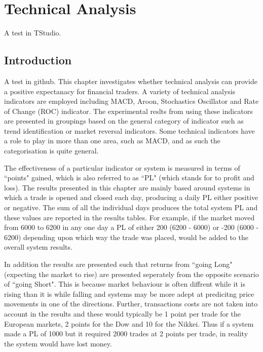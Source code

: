 
\chapter{Technical Analysis} %
 
\label{Chapter4} %


A test in TStudio.
\section{Introduction}
A test in github.
This chapter investigates whether technical analysis can provide a positive expectanacy for financial traders. A variety of technical analysis indicators are employed including MACD, Aroon, Stochastics Oscillator and Rate of Change (ROC) indicator. The experimental reslts from using these indicators are presented in groupings based on the general category of indicator such as trend identification or market reversal indicators. Some technical indicators have a role to play in more than one area, such as MACD, and as such the categorisation is quite general.

The effectiveness of a particular indicator or system is measured in terms of \textquotedblleft points" gained, which is also referred to as \textquotedblleft PL" (which stands for to profit and loss). The results presented in this chapter are mainly based around systems in which a trade is opened and closed each day, producing a daily PL either positive or negative. The sum of all the individual days produces the total system PL and these values are reported in the results tables. For example, if the market moved from 6000 to 6200 in any one day a PL of either 200 (6200 - 6000) or -200 (6000 - 6200) depending upon which way the trade was placed, would be added to the overall system results. 

In addition the results are presented such that returns from \textquotedblleft going Long" (expecting the market to rise) are presented seperately from the opposite scenario of \textquotedblleft going Short". This is because  market behaviour is often diffrent while it is rising than it is while falling and systems may be more adept at predicitng price movements in one of the directions. Further, transactions costs are not taken into account in the results and these would typically be 1 point per trade for the European markets, 2 points for the Dow and 10 for the Nikkei.  Thus if a system made a PL of 1000 but it required 2000 trades at 2 points per trade, in reality the system would have lost money. 

